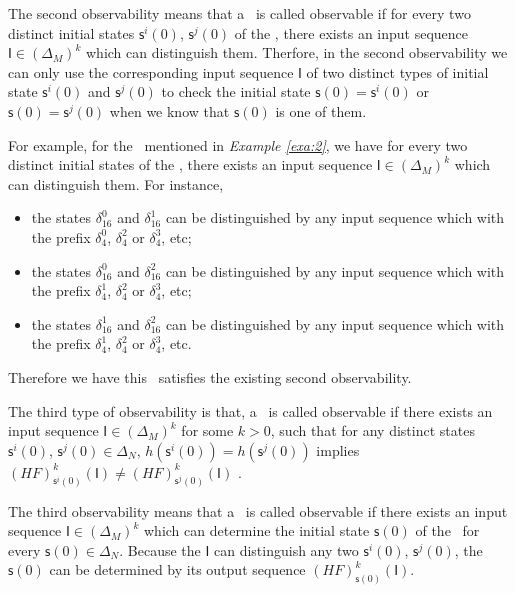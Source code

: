 The second observability means that a \BCN\ is called observable if for every two distinct initial states $\mathsf{s}^{i}(0)$, $\mathsf{s}^{j}(0)$ of the \BCN, there exists an input sequence $\mathsf{I}\in(\Delta_M)^k$ which can distinguish them. Therfore, in the second observability we can only use the corresponding input sequence $\mathsf{I}$ of two distinct types of initial state $\mathsf{s}^{i}(0)$ and $\mathsf{s}^{j}(0)$ to check the initial state $\mathsf{s}(0)=\mathsf{s}^{i}(0)$ or $\mathsf{s}(0)=\mathsf{s}^{j}(0)$ when we know that $\mathsf{s}(0)$ is one of them. 
\begin{example}
For example, for the \BCN\ mentioned in {\em Example \ref{exa:2}}, we have for every two distinct initial states of the \BCN, there exists an input sequence $\mathsf{I}\in(\Delta_M)^k$ which can distinguish them.  For instance,
\begin{itemize}
  \item the states $\delta_{16}^0$ and $\delta_{16}^1$ can be distinguished by any input sequence which with the prefix $\delta_{4}^0$, $\delta_{4}^2 $ or $\delta_{4}^3$, etc;
  \item the states $\delta_{16}^0$ and $\delta_{16}^2$  can be distinguished by any input sequence which with the prefix $\delta_{4}^1$, $\delta_{4}^2$ or $\delta_{4}^3$, etc;
  \item the states $\delta_{16}^1$ and $\delta_{16}^2$  can be distinguished by any input sequence which with the prefix $\delta_{4}^1$, $\delta_{4}^2$ or $\delta_{4}^3$, etc.
\end{itemize} 

Therefore we have this \BCN\ satisfies the existing second observability.
\label{exa:5}
\end{example}   
\begin{definition}
The third type of observability is that, a \BCN\ is called observable if there exists an input sequence $\mathsf{I}\in(\Delta_M)^k$ for some $k>0$, such that for any distinct states $\mathsf{s}^{i}(0)$, $\mathsf{s}^{j}(0) \in \Delta_N$, $h(\mathsf{s}^{i}(0))=h(\mathsf{s}^{j}(0))$ implies $(HF)^k_{\mathsf{s}^{i}(0)}(\mathsf{I})\neq (HF)^k_{\mathsf{s}^{j}(0)}(\mathsf{I})$ \cite{Cheng2011Identification}.
\end{definition}

The third observability means that a \BCN\ is called observable if there exists an input sequence $\mathsf{I}\in(\Delta_M)^k$ which can determine the initial state $\mathsf{s}(0)$ of the \BCN\ for every $\mathsf{s}(0)\in\Delta_N$. Because the $\mathsf{I}$ can distinguish any two $\mathsf{s}^{i}(0)$, $\mathsf{s}^{j}(0)$, the $\mathsf{s}(0)$ can be determined by its output sequence $(HF)^k_{\mathsf{s}(0)}(\mathsf{I})$.


